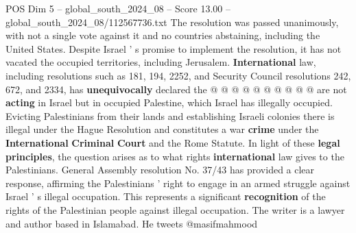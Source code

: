\begin{textsample}{POS Dim 5 – global\_south\_2024\_08 – Score 13.00 – global\_south\_2024\_08/112567736.txt}
The resolution was passed unanimously, with not a single vote against it and no countries abstaining, including the United States.
Despite Israel ' s promise to implement the resolution, it has not vacated the occupied territories, including Jerusalem. \textbf{International} law, including resolutions such as 181, 194, 2252, and Security Council resolutions 242, 672, and 2334, has \textbf{unequivocally} declared the @ @ @ @ @ @ @ @ @ @ are not \textbf{acting} in Israel but in occupied Palestine, which Israel has illegally occupied.
Evicting Palestinians from their lands and establishing Israeli colonies there is illegal under the Hague Resolution and constitutes a war \textbf{crime} under the \textbf{International} \textbf{Criminal} \textbf{Court} and the Rome Statute.
In light of these \textbf{legal} \textbf{principles}, the question arises as to what rights \textbf{international} law gives to the Palestinians.
General Assembly resolution No. 37/43 has provided a clear response, affirming the Palestinians ' right to engage in an armed struggle against Israel ' s illegal occupation.
This represents a significant \textbf{recognition} of the rights of the Palestinian people against illegal occupation.
The writer is a lawyer and author based in Islamabad.
He tweets @masifmahmood

\end{textsample}
